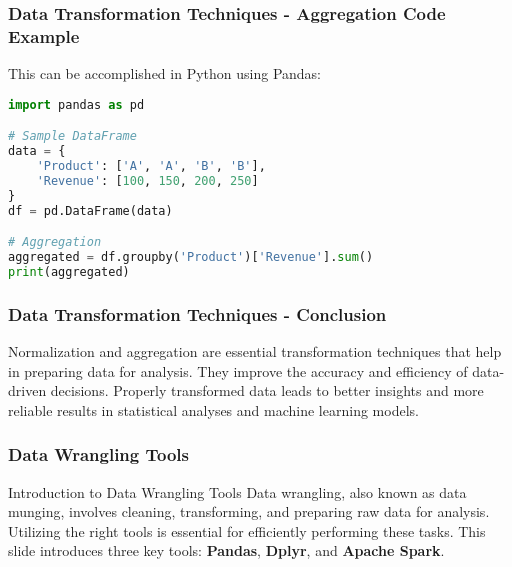 \documentclass[aspectratio=169]{beamer}
\begin{document}
\begin{frame}[fragile]
    \frametitle{Data Transformation Techniques - Aggregation Code Example}
    This can be accomplished in Python using Pandas:
    \begin{lstlisting}[language=Python]
import pandas as pd

# Sample DataFrame
data = {
    'Product': ['A', 'A', 'B', 'B'],
    'Revenue': [100, 150, 200, 250]
}
df = pd.DataFrame(data)

# Aggregation
aggregated = df.groupby('Product')['Revenue'].sum()
print(aggregated)
    \end{lstlisting}
\end{frame}

\begin{frame}[fragile]
    \frametitle{Data Transformation Techniques - Conclusion}
    Normalization and aggregation are essential transformation techniques that help in preparing data for analysis. They improve the accuracy and efficiency of data-driven decisions. Properly transformed data leads to better insights and more reliable results in statistical analyses and machine learning models.
\end{frame}

\begin{frame}
    \frametitle{Data Wrangling Tools}
    \begin{block}{Introduction to Data Wrangling Tools}
        Data wrangling, also known as data munging, involves cleaning, transforming, and preparing raw data for analysis. Utilizing the right tools is essential for efficiently performing these tasks. This slide introduces three key tools: \textbf{Pandas}, \textbf{Dplyr}, and \textbf{Apache Spark}.
    \end{block}
\end{frame}
\end{document}
